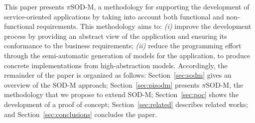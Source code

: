 This paper presents $\pi$SOD-M,  a methodology for supporting the development of service-oriented applications by taking into account both functional and non-functional requirements. This methodology aims to:
\textit{(i)} improve the development process by providing an abstract view of the application and ensuring its conformance to the business requirements;
\textit{(ii)} reduce the programming effort through the semi-automatic generation of  models for the application, to produce concrete implementations from high-abstraction models.
%
Accordingly, the remainder of the paper is organized as follows:
Section~\ref{sec:sodm}  gives an overview of the SOD-M approach;
Section~\ref{sec:pisodm} presents $\pi$SOD-M, the methodology that we propose to extend SOD-M;
Section~\ref{sec:poc} shows the development of a proof of concept;
Section~\ref{sec:related} describes related works; and
Section~\ref{sec:conclusions} concludes the paper. %
